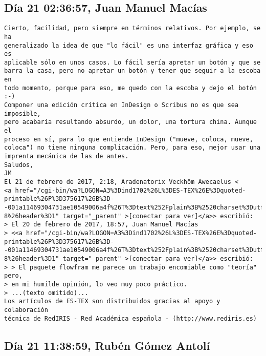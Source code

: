 \documentclass[a4paper,10pt]{article}
\begin{document}
\subsection{Día 21 02:36:57, Juan Manuel Macías}

\begin{lstlisting}
Cierto, facilidad, pero siempre en términos relativos. Por ejemplo, se ha
generalizado la idea de que "lo fácil" es una interfaz gráfica y eso es
aplicable sólo en unos casos. Lo fácil sería apretar un botón y que se
barra la casa, pero no apretar un botón y tener que seguir a la escoba en
todo momento, porque para eso, me quedo con la escoba y dejo el botón :-)
Componer una edición crítica en InDesign o Scribus no es que sea imposible,
pero acabaría resultando absurdo, un dolor, una tortura china. Aunque el
proceso en sí, para lo que entiende InDesign ("mueve, coloca, mueve,
coloca") no tiene ninguna complicación. Pero, para eso, mejor usar una
imprenta mecánica de las de antes.
Saludos,
JM
El 21 de febrero de 2017, 2:18, Aradenatorix Veckhôm Awecaelus <
<a href="/cgi-bin/wa?LOGON=A3%3Dind1702%26L%3DES-TEX%26E%3Dquoted-printable%26P%3D375617%26B%3D--001a11469304731ae10549006a4f%26T%3Dtext%252Fplain%3B%2520charset%3Dutf-8%26header%3D1" target="_parent" >[conectar para ver]</a>> escribió:
> El 20 de febrero de 2017, 18:57, Juan Manuel Macías
> <<a href="/cgi-bin/wa?LOGON=A3%3Dind1702%26L%3DES-TEX%26E%3Dquoted-printable%26P%3D375617%26B%3D--001a11469304731ae10549006a4f%26T%3Dtext%252Fplain%3B%2520charset%3Dutf-8%26header%3D1" target="_parent" >[conectar para ver]</a>> escribió:
> > El paquete flowfram me parece un trabajo encomiable como "teoría" pero,
> en mi humilde opinión, lo veo muy poco práctico.
> ...(texto omitido)...
Los artículos de ES-TEX son distribuidos gracias al apoyo y colaboración 
técnica de RedIRIS - Red Académica española - (http://www.rediris.es)

\end{lstlisting}

\subsection{Día 21 11:38:59, Rubén Gómez Antolí}
\end{document}
